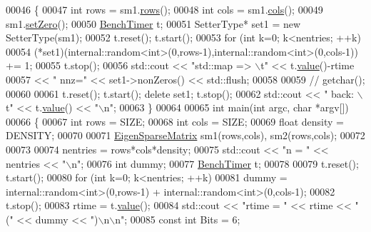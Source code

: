\begin{DoxyCode}
00046 \{
00047   \textcolor{keywordtype}{int} rows = sm1.\hyperlink{group___sparse_core___module_a62e61bb861eee306d5b069ce652b5aa5}{rows}();
00048   \textcolor{keywordtype}{int} cols = sm1.\hyperlink{group___sparse_core___module_aa391750e3c530227e4a5c3c52e959975}{cols}();
00049   sm1.\hyperlink{group___sparse_core___module_ad3c7416090f913e8685523cb3ab7c2f7}{setZero}();
00050   \hyperlink{class_eigen_1_1_bench_timer}{BenchTimer} t;
00051   SetterType* set1 = \textcolor{keyword}{new} SetterType(sm1);
00052   t.reset(); t.start();
00053   \textcolor{keywordflow}{for} (\textcolor{keywordtype}{int} k=0; k<nentries; ++k)
00054     (*set1)(internal::random<int>(0,rows-1),internal::random<int>(0,cols-1)) += 1;
00055   t.stop();
00056   std::cout << \textcolor{stringliteral}{"std::map =>      \(\backslash\)t"} << t.\hyperlink{class_eigen_1_1_bench_timer_a26760f963ed8b64c126159bfea57735e}{value}()-rtime
00057             << \textcolor{stringliteral}{" nnz="} << set1->nonZeros() << std::flush;
00058 
00059   \textcolor{comment}{// getchar();}
00060 
00061   t.reset(); t.start(); \textcolor{keyword}{delete} set1; t.stop();
00062   std::cout << \textcolor{stringliteral}{"  back: \(\backslash\)t"} << t.\hyperlink{class_eigen_1_1_bench_timer_a26760f963ed8b64c126159bfea57735e}{value}() << \textcolor{stringliteral}{"\(\backslash\)n"};
00063 \}
00064     
00065 \textcolor{keywordtype}{int} main(\textcolor{keywordtype}{int} argc, \textcolor{keywordtype}{char} *argv[])
00066 \{
00067   \textcolor{keywordtype}{int} rows = SIZE;
00068   \textcolor{keywordtype}{int} cols = SIZE;
00069   \textcolor{keywordtype}{float} density = DENSITY;
00070 
00071   \hyperlink{group___sparse_core___module}{EigenSparseMatrix} sm1(rows,cols), sm2(rows,cols);
00072 
00073 
00074   nentries = rows*cols*density;
00075   std::cout << \textcolor{stringliteral}{"n = "} << nentries << \textcolor{stringliteral}{"\(\backslash\)n"};
00076   \textcolor{keywordtype}{int} dummy;
00077   \hyperlink{class_eigen_1_1_bench_timer}{BenchTimer} t;
00078 
00079   t.reset(); t.start();
00080   \textcolor{keywordflow}{for} (\textcolor{keywordtype}{int} k=0; k<nentries; ++k)
00081     dummy = internal::random<int>(0,rows-1) + internal::random<int>(0,cols-1);
00082   t.stop();
00083   rtime = t.\hyperlink{class_eigen_1_1_bench_timer_a26760f963ed8b64c126159bfea57735e}{value}();
00084   std::cout << \textcolor{stringliteral}{"rtime = "} << rtime << \textcolor{stringliteral}{" ("} << dummy << \textcolor{stringliteral}{")\(\backslash\)n\(\backslash\)n"};
00085   \textcolor{keyword}{const} \textcolor{keywordtype}{int} Bits = 6;

\end{DoxyCode}

